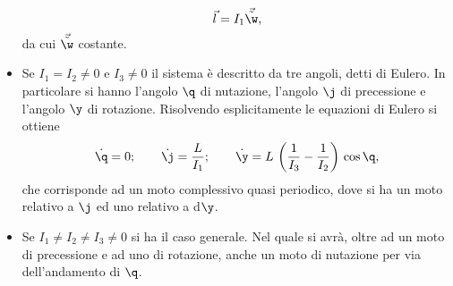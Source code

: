 \begin{itemize}
	      \[
		      \vec{l} = I_1 \vec{\tilde{\w}},
	      \]
	      da cui \(\vec{\tilde{\w}}\) costante.
	\item Se \(I_1=I_2\neq 0\) e \(I_3\neq 0\) il sistema è descritto da tre angoli, detti di Eulero. In particolare si hanno l'angolo \(\q\) di nutazione, l'angolo \(\j\) di precessione e l'angolo \(\y\) di rotazione.
	      Risolvendo esplicitamente le equazioni di Eulero si ottiene
	      \[
		      \dot{\q} = 0; \qquad \dot{\j} = \frac{L}{I_1}; \qquad \dot{\y} = L\,\left(\frac{1}{I_3}-\frac{1}{I_2}\right)\,\cos\q,
	      \]
	      che corrisponde ad un moto complessivo quasi periodico, dove si ha un moto relativo a \(\j\) ed uno relativo a d\(\y\).
	\item Se \(I_1\neq I_2\neq I_3 \neq 0\) si ha il caso generale. Nel quale si avrà, oltre ad un moto di precessione e ad uno di rotazione, anche un moto di nutazione per via dell'andamento di \(\q\).
\end{itemize}

